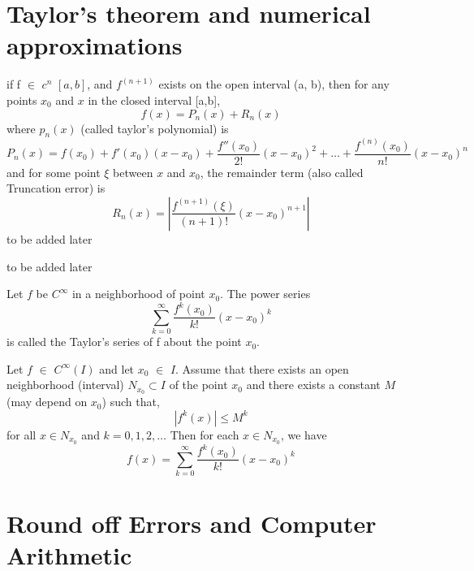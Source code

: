 \documentclass[../Main.tex]{subfiles}
\begin{document}

\section{Taylor's theorem and numerical approximations}

{ if f $\in$ $c^n$ $[a,b]$, and $f^{(n+1)}$ exists on the open interval (a, b), then for any points $x_0$ and $x$ in the closed interval [a,b],
\begin{equation}
f(x) = P_n(x) + R_n(x)
\end{equation}
where $p_n(x)$ (called taylor's polynomial) is
\begin{equation}
P_n(x) = f(x_0) + f'(x_0)(x-x_0) + \frac{f''(x_0)}{2!}(x-x_0)^2 + \dots + \frac{f^{(n)}(x_0)}{n!}(x-x_0)^n
\end{equation}
and for some point $\xi$ between $x$ and $x_0$, the remainder term (also called Truncation error) is
\begin{equation}
R_n(x) = \left |{\frac{f^{(n+1)}(\xi)}{(n+1)!}(x-x_0)^{n+1}}\right |
\end{equation}
}{to be added later}


{ to be added later}

{Let $f$ be $C^\infty$ in a neighborhood of point $x_0$. The power series
\begin{equation}
   \sum_{k=0}^{\infty} \frac{f^k(x_0)}{k!}(x-x_0)^k
\end{equation}
is called the Taylor's series of f about the point $x_0$.
}

\thmp{}
{
   Let $f$ $\in$ $C^{\infty}(I)$ and let $x_0$ $\in$ $I$. Assume that there exists an open neighborhood (interval) $N_{x_0} \subset I$ of the point $x_0$ and there exists a constant $M$ (may depend on $x_0$) such that,
   \begin{equation}
      \left | f^{k}(x) \right | \leq M^k
   \end{equation}
   for all $x \in N_{x_0}$ and $k = 0, 1, 2, \dots$ Then for each $x \in N_{x_0}$, we have
   \begin{equation}
      f(x) = \sum_{k=0}^{\infty} \frac{f^k(x_0)}{k!}(x-x_0)^k
   \end{equation}
}
{}

\section{Round off Errors and Computer Arithmetic}
\end{document}
